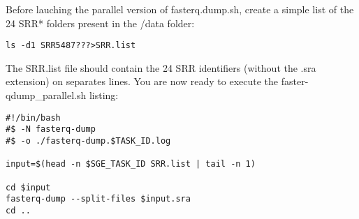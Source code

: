 Before lauching the parallel version of fasterq.dump.sh, create a simple list of the 24 SRR* folders present in the /data folder:

\begin{verbatim}
ls -d1 SRR5487???>SRR.list
\end{verbatim}

The SRR.list file should contain the 24 SRR identifiers (without the .sra extension) on separates lines. You are now ready to execute the faster-qdump\_parallel.sh listing:

\begin{verbatim}
#!/bin/bash
#$ -N fasterq-dump
#$ -o ./fasterq-dump.$TASK_ID.log
	
input=$(head -n $SGE_TASK_ID SRR.list | tail -n 1)
	
cd $input
fasterq-dump --split-files $input.sra
cd ..
\end{verbatim}












